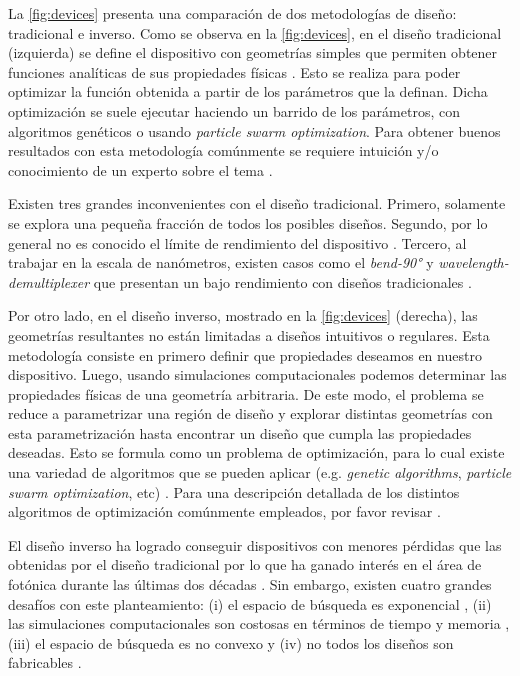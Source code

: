 La \autoref{fig:devices} presenta una comparación de dos metodologías de diseño: tradicional e inverso.
Como se observa en la \autoref{fig:devices}, en el diseño tradicional (izquierda) se define el dispositivo con geometrías simples que permiten obtener funciones analíticas de sus propiedades físicas \citep{Hughes2016, Song2008}. 
Esto se realiza para poder optimizar la función obtenida a partir de los parámetros que la definan. 
Dicha optimización se suele ejecutar haciendo un barrido de los parámetros, con algoritmos genéticos o usando \emph{particle swarm optimization}. 
Para obtener buenos resultados con esta metodología comúnmente se requiere intuición 
y/o conocimiento de un experto sobre el tema \citep{Su2020}. 


Existen tres grandes inconvenientes con el diseño tradicional. 
Primero, solamente se explora una pequeña fracción de todos los posibles diseños.
Segundo, por lo general no es conocido el límite de rendimiento del dispositivo
\citep{Molesky2018}.
Tercero, al trabajar en la escala de nanómetros, existen casos como el
\emph{bend-90°} y \emph{wavelength-demultiplexer} que presentan un bajo rendimiento con diseños tradicionales \citep{Su2020}.

Por otro lado, en el diseño inverso, mostrado en la \autoref{fig:devices}
(derecha), las geometrías resultantes no están limitadas a diseños intuitivos o regulares.
Esta metodología consiste en primero definir que propiedades deseamos en nuestro dispositivo.
Luego, usando simulaciones computacionales podemos determinar las propiedades físicas
de una geometría arbitraria. De este modo, el problema se reduce a parametrizar una región
de diseño y explorar distintas geometrías con esta parametrización hasta encontrar un diseño
que cumpla las propiedades deseadas.
Esto se formula como un problema de optimización, para lo cual existe una variedad de algoritmos
que se pueden aplicar (e.g. \emph{genetic algorithms}, \emph{particle swarm optimization}, etc)
\citep{Molesky2018, Su2020}.
Para una descripción detallada de los distintos algoritmos de optimización
comúnmente empleados, por favor revisar \cite{Schneider2019, Elsawy2020, Campbell2019}.


El diseño inverso ha logrado conseguir dispositivos con menores pérdidas que las obtenidas por el
diseño tradicional por lo que ha ganado interés en el área de fotónica durante
las últimas dos décadas \citep{Su2018, Molesky2018, Campbell2019}. 
Sin embargo, existen cuatro grandes desafíos con este planteamiento:
(i) el espacio de búsqueda es exponencial \citep{Vuckovic2019}, 
(ii) las simulaciones computacionales son costosas en términos de tiempo y memoria \citep{Kudyshev2020}, 
(iii) el espacio de búsqueda es no convexo \citep{Su2018} y
(iv) no todos los diseños son fabricables \citep{Su2020}.


